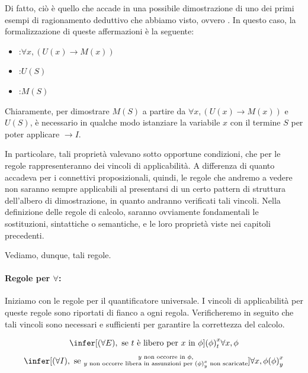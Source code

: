 Di fatto, ciò è quello che accade in una possibile dimostrazione di uno dei primi esempi di ragionamento deduttivo che abbiamo visto, ovvero . In questo caso, la formalizzazione di queste affermazioni è la seguente:
\begin{itemize}
  \item {}:\(\forall x, (U(x)\to M(x))\)
  \item {}:\( U(S)\)
  \item {}:\(M(S)\)
\end{itemize}

Chiaramente, per dimostrare \(M(S)\) a partire da \(\forall x, (U(x)\to M(x))\) e \(U(S)\), è necessario in qualche modo istanziare la variabile \(x\) con il termine \(S\) per poter applicare \(\to I\).

In particolare, tali proprietà valevano sotto opportune condizioni, che per le regole rappresenteranno dei vincoli di applicabilità. A differenza di quanto accadeva per i connettivi proposizionali, quindi, le regole che andremo a vedere non saranno sempre applicabili al presentarsi di un certo pattern di struttura dell'albero di dimostrazione, in quanto andranno verificati tali vincoli.
Nella definizione delle regole di calcolo, saranno ovviamente fondamentali le sostituzioni, sintattiche o semantiche, e le loro proprietà viste nei capitoli precedenti. 

Vediamo, dunque, tali regole.

\paragraph{Regole per \(\forall\):}

Iniziamo con le regole per il quantificatore universale. I vincoli di applicabilità per queste regole sono riportati di fianco a ogni regola. Verificheremo in seguito che tali vincoli sono necessari e sufficienti per garantire la correttezza del calcolo.

\begin{equation*}
  \infer[(\forall E), \text{ se } t \text{ è libero per } x \text{ in } \phi]{\subs{\phi}{x}{t}}{\forall x, \phi}
\end{equation*}
\begin{equation*}
  \infer[(\forall I), \text{ se } \substack{ y \text{ non occorre in } \phi, \\ y \text{ non occorre libera in assunzioni per } {\subs{\phi}{x}{y}} \text{ non scaricate}}]{\forall x, \phi}{\subs{\phi}{x}{y}}
\end{equation*}

